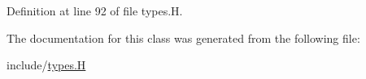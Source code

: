 Definition at line 92 of file types.\+H.



The documentation for this class was generated from the following file\+:\begin{DoxyCompactItemize}
\item 
include/\hyperlink{types_8_h}{types.\+H}\end{DoxyCompactItemize}
